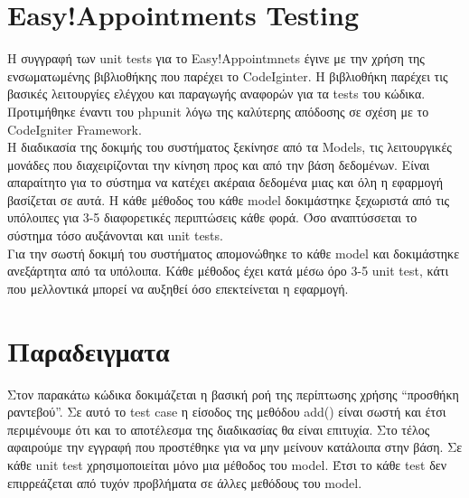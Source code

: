 \documentclass[12pt]{article}
\begin{document}
\section {Easy!Appointments Testing}
Η συγγραφή των unit tests για το Easy!Appointmnets έγινε με την χρήση της ενσωματωμένης βιβλιοθήκης που παρέχει το CodeIginter. Η βιβλιοθήκη παρέχει τις βασικές λειτουργίες ελέγχου και παραγωγής αναφορών για τα tests του κώδικα. Προτιμήθηκε έναντι του phpunit λόγω της καλύτερης απόδοσης σε σχέση με το CodeIgniter Framework. 
\\[0.3cm]
Η διαδικασία της δοκιμής του συστήματος ξεκίνησε από τα Models, τις λειτουργικές μονάδες που διαχειρίζονται την κίνηση προς και από την βάση δεδομένων. Είναι απαραίτητο για το σύστημα να κατέχει ακέραια δεδομένα μιας και όλη η εφαρμογή βασίζεται σε αυτά. Η κάθε μέθοδος του κάθε model δοκιμάστηκε ξεχωριστά από τις υπόλοιπες για 3-5 διαφορετικές περιπτώσεις κάθε φορά. Όσο αναπτύσσεται το σύστημα τόσο αυξάνονται και unit tests. 
\\[0.3cm]
Για την σωστή δοκιμή του συστήματος απομονώθηκε το κάθε model και δοκιμάστηκε ανεξάρτητα από τα υπόλοιπα. Κάθε μέθοδος έχει κατά μέσω όρο 3-5 unit test, κάτι που μελλοντικά μπορεί να αυξηθεί όσο επεκτείνεται η εφαρμογή. 

\section {Παραδειγματα} 
Στον παρακάτω κώδικα δοκιμάζεται η βασική ροή της περίπτωσης χρήσης “προσθήκη ραντεβού”. Σε αυτό το test case η είσοδος της μεθόδου add() είναι σωστή και έτσι περιμένουμε ότι και το αποτέλεσμα  της διαδικασίας θα είναι επιτυχία. Στο τέλος αφαιρούμε την εγγραφή που προστέθηκε για να μην μείνουν κατάλοιπα στην βάση.  Σε κάθε unit test χρησιμοποιείται μόνο μια μέθοδος του model. Έτσι το κάθε test δεν επιρρεάζεται από τυχόν προβλήματα σε άλλες μεθόδους του model.
\end{document}
